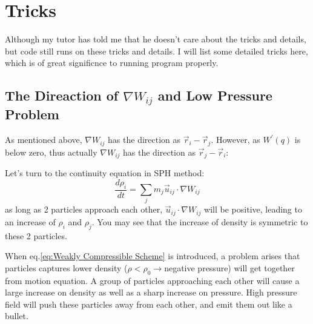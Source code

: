 \section{Tricks}

Although my tutor has told me that he doesn't care about the tricks and details, 
but code still runs on these tricks and details.
I will list some detailed tricks here, 
which is of great significnce to running program properly.

\subsection{The Direaction of $\nabla W_{ij}$ and Low Pressure Problem}

As mentioned above, $\nabla W_{ij}$ has the direction as $\vec{r}_i - \vec{r}_j$.
However, as $W^\prime(q)$ is below zero, 
thus actually $\nabla W_{ij}$ has the direction as $\vec{r}_j - \vec{r}_i$:

\begin{figure}[H]
    \centering
\end{figure}

Let's turn to the continuity equation in SPH method:
\begin{equation}
    \frac{d\rho_i}{dt} = \sum_j m_j \vec{u}_{ij} \cdot \nabla W_{ij}
\end{equation}
as long as 2 particles approach each other, 
$\vec{u}_{ij}\cdot \nabla W_{ij}$ will be positive, 
leading to an increase of $\rho_i$ and $\rho_j$.
You may see that the increase of density is symmetric to these 2 particles.

When eq.\ref{eq:Weakly Compressible Scheme} is introduced, 
a problem arises that particles captures lower density ($\rho<\rho_0\to$negative pressure) 
will get together from motion equation.
A group of particles approaching each other will cause a large increase on density 
as well as a sharp increase on pressure.
High pressure field will push these particles away from each other, 
and emit them out like a bullet.

